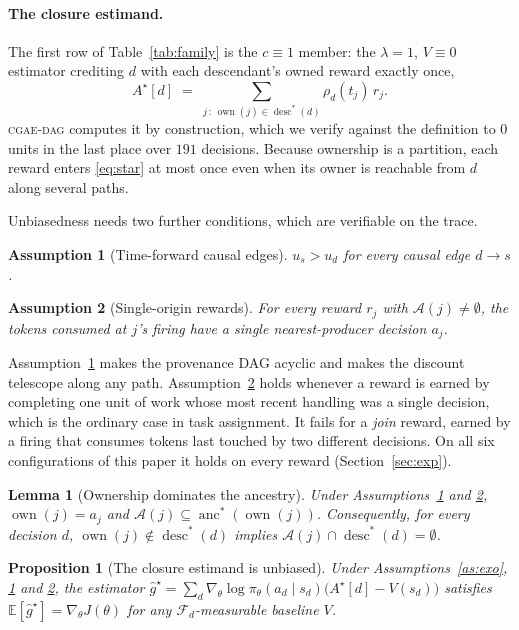 \documentclass[review,authoryear,3p,times]{elsarticle}
\newtheorem{proposition}{Proposition}
\newtheorem{assumption}{Assumption}
\newtheorem{lemma}{Lemma}
\newcommand{\cdag}{\textsc{cgae-dag}}          %
\newcommand{\Fscr}{\mathcal{F}}
\newcommand{\Ascr}{\mathcal{A}}
\newcommand{\Ex}{\mathbb{E}}
\newcommand{\desc}{\operatorname{desc}}
\newcommand{\anc}{\operatorname{anc}}
\newcommand{\own}{\operatorname{own}}
\begin{document}
\paragraph{The closure estimand.} The first row of Table~\ref{tab:family} is
the $c\equiv1$ member: the $\lambda=1$, $V\equiv0$ estimator crediting $d$ with
each descendant's owned reward exactly once,
\begin{equation}
  A^{\star}[d] \;=\; \sum_{j\,:\,\own(j)\in\desc^{*}(d)} \rho_d(t_j)\,r_j .
  \label{eq:star}
\end{equation}
\cdag{} computes it by construction, which we verify against the definition to
$0$ units in the last place over $191$ decisions. Because ownership is a
partition, each reward enters \eqref{eq:star} at most once even when its owner
is reachable from $d$ along several paths.

Unbiasedness needs two further conditions, which are verifiable on the trace.

\begin{assumption}[Time-forward causal edges]
\label{as:time}
$u_s > u_d$ for every causal edge $d\!\to\!s$.
\end{assumption}

\begin{assumption}[Single-origin rewards]
\label{as:origin}
For every reward $r_j$ with $\Ascr(j)\neq\emptyset$, the tokens consumed at
$j$'s firing have a single nearest-producer decision $a_j$.
\end{assumption}

Assumption~\ref{as:time} makes the provenance DAG acyclic and makes the
discount telescope along any path. Assumption~\ref{as:origin} holds whenever a
reward is earned by completing one unit of work whose most recent handling was
a single decision, which is the ordinary case in task assignment. It fails for
a \emph{join} reward, earned by a firing that consumes tokens last touched by
two different decisions. On all six configurations of this paper it holds on
every reward (Section~\ref{sec:exp}).

\begin{lemma}[Ownership dominates the ancestry]
\label{lem:own}
Under Assumptions~\ref{as:time} and \ref{as:origin},
$\own(j)=a_j$ and $\Ascr(j)\subseteq\anc^{*}(\own(j))$. Consequently, for every
decision $d$, $\own(j)\notin\desc^{*}(d)$ implies
$\Ascr(j)\cap\desc^{*}(d)=\emptyset$.
\end{lemma}

\begin{proposition}[The closure estimand is unbiased]
\label{prop:star}
Under Assumptions~\ref{as:exo}, \ref{as:time} and \ref{as:origin}, the estimator
$\hat g^{\star}=\sum_{d}\nabla_\theta\log\pi_\theta(a_d\mid s_d)\bigl(A^{\star}[d]-V(s_d)\bigr)$
satisfies $\Ex[\hat g^{\star}]=\nabla_\theta J(\theta)$ for any
$\Fscr_d$-measurable baseline $V$.
\end{proposition}
\end{document}
